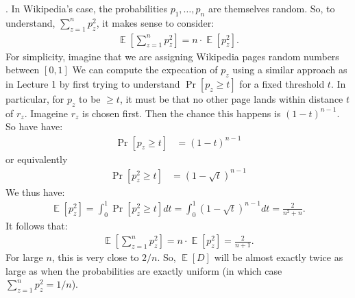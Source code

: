\documentclass[11pt]{article}
\DeclareMathOperator*{\E}{\mathbb{E}}
\begin{document}
\smallskip{}.\hspace{1em} 
In Wikipedia's case, the probabilities $p_1, \ldots, p_n$ are themselves random. So, to understand, $\sum_{z=1}^n p_z^2$, it makes sense to consider:
\begin{align*}
\E\left[\sum_{z=1}^n p_z^2\right] = n \cdot \E[p_z^2]. 
\end{align*} 
For simplicity, imagine that we are assigning Wikipedia pages random numbers between $[0,1]$
We can compute the expecation of $p_z$ using a similar approach as in Lecture 1 by first trying to understand $\Pr[p_z \geq t]$ for a fixed threshold $t$. In particular, for $p_z$ to be $\geq t$, it must be that no other page lands within distance $t$ of $r_z$. Imageine $r_z$ is chosen first. Then the chance this happens is $(1-t)^{n-1}$. So have have:
\begin{align*}
\Pr[p_z \geq t] &= (1-t)^{n-1}
\end{align*} 
or equivalently 
\begin{align*}
	\Pr[p_z^2 \geq t] &= (1-\sqrt{t})^{n-1}
\end{align*} 
We thus have:
\begin{align*}
	\E[p_z^2] = \int_{0}^1 \Pr[p_z^2 \geq t] dt = \int_{0}^1 (1-\sqrt{t})^{n-1} dt = \frac{2}{n^2 + n}. 
\end{align*} 
It follows that:
\begin{align*}
	\E\left[\sum_{z=1}^n p_z^2\right] = n \cdot \E[p_z^2] = \frac{2}{n+1}.
\end{align*} 
For large $n$, this is very close to $2/n$. So, $\E[D]$ will be almost exactly twice as large as when the probabilities are exactly uniform (in which case $\sum_{z=1}^n p_z^2 = 1/n$).
\end{document}
